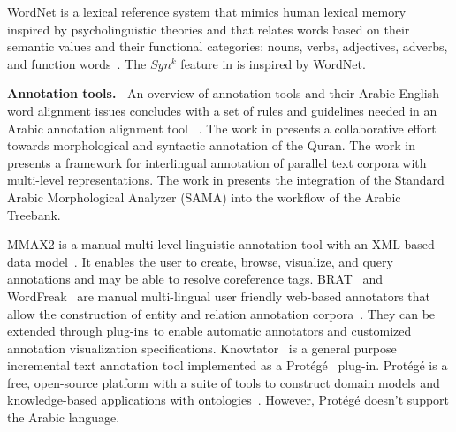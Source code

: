 WordNet is a lexical reference system that mimics human lexical memory inspired 
by psycholinguistic theories and that relates words based on their semantic values and their functional 
categories: nouns, verbs, adjectives, adverbs, and function words~\cite{intro}. 
The $Syn^k$ feature in \framework is inspired by WordNet. 

{\bf Annotation tools.~}
An overview of annotation tools and their Arabic-English word alignment issues 
concludes with a set of rules and guidelines needed in an Arabic annotation alignment tool
~\cite{kholidy2010towards}. 
The work in \cite{dukes2011supervised} presents a collaborative effort towards morphological 
and syntactic annotation of the Quran. 
The work in \cite{dorr2010interlingual} presents a framework for interlingual 
annotation of parallel text corpora with multi-level representations. 
The work in \cite{kulick2010consistent} presents the integration of the 
Standard Arabic Morphological Analyzer (SAMA) into the workflow of the Arabic Treebank.

MMAX2 is a manual multi-level linguistic annotation tool with an XML 
based data model~\cite{mmax2}. 
It enables the user to create, browse, visualize, and query annotations
and may be able to resolve coreference tags. 
BRAT~\cite{brat} and WordFreak~\cite{wordfreak} are manual 
multi-lingual user friendly web-based annotators that allow the construction 
of entity and relation annotation corpora~\cite{brat}. 
They can be extended through plug-ins to enable automatic annotators 
and customized annotation visualization specifications.
Knowtator~\cite{ogren2006knowtator} is a general purpose incremental text annotation tool 
implemented as a Prot\'eg\'e~\cite{gennari2003evolution} plug-in. 
Prot\'eg\'e is a free, open-source platform with a suite of tools to construct domain 
models and knowledge-based applications with ontologies~\cite{gennari2003evolution}. 
However, Prot\'eg\'e doesn't support the Arabic language.

